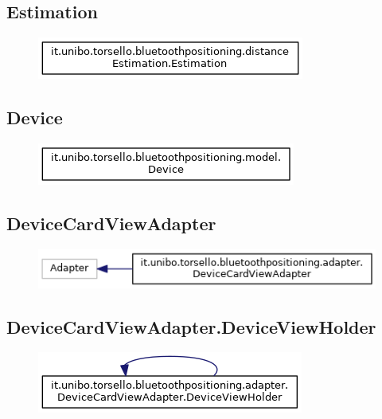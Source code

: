 \newpage
\subsection{Estimation}
\begin{figure}[ph]
	\centering
	\includegraphics[scale=.55]{img/uml/inherit_graph/inherit_graph_8.png}
	\caption[]{}
\end{figure}

\newpage
\subsection{Device}
\begin{figure}[ph]
	\centering
	\includegraphics[scale=.55]{img/uml/inherit_graph/inherit_graph_13.png}
	\caption[]{}
\end{figure}

\newpage
\subsection{DeviceCardViewAdapter}
\begin{figure}[ph]
	\centering
	\includegraphics[scale=.55]{img/uml/inherit_graph/inherit_graph_1.png}
	\caption[]{}
\end{figure}

\newpage
\subsection{DeviceCardViewAdapter.DeviceViewHolder}
\begin{figure}[ph]
	\centering
	\includegraphics[scale=.55]{img/uml/inherit_graph/inherit_graph_2.png}
	\caption[]{}
\end{figure}

